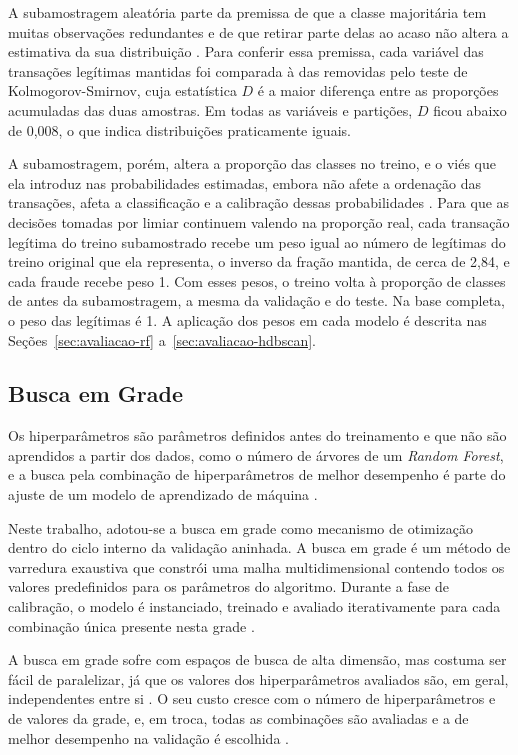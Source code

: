 \documentclass{uflamon}          %
\begin{document}
A subamostragem aleatória parte da premissa de que a classe majoritária tem muitas observações redundantes e de que retirar parte delas ao acaso não altera a estimativa da sua distribuição \cite{dalpozzolo2015}. Para conferir essa premissa, cada variável das transações legítimas mantidas foi comparada à das removidas pelo teste de Kolmogorov-Smirnov, cuja estatística $D$ é a maior diferença entre as proporções acumuladas das duas amostras. Em todas as variáveis e partições, $D$ ficou abaixo de 0,008, o que indica distribuições praticamente iguais.

A subamostragem, porém, altera a proporção das classes no treino, e o viés que ela introduz nas probabilidades estimadas, embora não afete a ordenação das transações, afeta a classificação e a calibração dessas probabilidades \cite{dalpozzolo2015}. Para que as decisões tomadas por limiar continuem valendo na proporção real, cada transação legítima do treino subamostrado recebe um peso igual ao número de legítimas do treino original que ela representa, o inverso da fração mantida, de cerca de 2,84, e cada fraude recebe peso 1. Com esses pesos, o treino volta à proporção de classes de antes da subamostragem, a mesma da validação e do teste. Na base completa, o peso das legítimas é 1. A aplicação dos pesos em cada modelo é descrita nas Seções~\ref{sec:avaliacao-rf} a~\ref{sec:avaliacao-hdbscan}.

\subsection{Busca em Grade}
\label{sec:grid-search}

Os hiperparâmetros são parâmetros definidos antes do treinamento e que não são aprendidos a partir dos dados, como o número de árvores de um \textit{Random Forest}, e a busca pela combinação de hiperparâmetros de melhor desempenho é parte do ajuste de um modelo de aprendizado de máquina \cite{shams2024}.

Neste trabalho, adotou-se a busca em grade como mecanismo de otimização dentro do ciclo interno da validação aninhada. A busca em grade é um método de varredura exaustiva que constrói uma malha multidimensional contendo todos os valores predefinidos para os parâmetros do algoritmo. Durante a fase de calibração, o modelo é instanciado, treinado e avaliado iterativamente para cada combinação única presente nesta grade \cite{shams2024}. 

A busca em grade sofre com espaços de busca de alta dimensão, mas costuma ser fácil de paralelizar, já que os valores dos hiperparâmetros avaliados são, em geral, independentes entre si \cite{liashchynskyi2019}. O seu custo cresce com o número de hiperparâmetros e de valores da grade, e, em troca, todas as combinações são avaliadas e a de melhor desempenho na validação é escolhida \cite{shams2024}.
\end{document}

